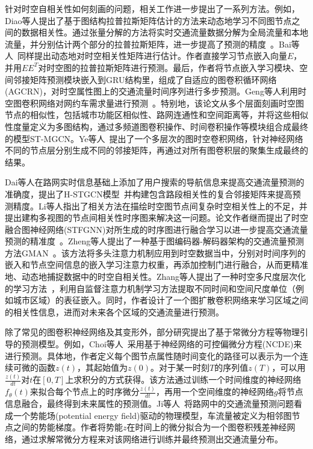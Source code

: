 针对时空自相关性如何刻画的问题，相关工作进一步提出了一系列方法。例如，Diao等人提出了基于图结构拉普拉斯矩阵估计的方法来动态地学习不同图节点之间的数据相关性。通过张量分解的方法将实时交通流量数据分解为全局流量和本地流量，并分别估计两个部分的拉普拉斯矩阵，进一步提高了预测的精度~\cite{diao2019dynamic}。Bai等人~\cite{bai2020adaptive}同样提出动态地对时空相关性矩阵进行估计。作者直接学习节点嵌入向量$E$，并用$EE^T$对时空图的拉普拉斯矩阵进行预测。最后，作者将节点嵌入学习模块、空间邻接矩阵预测模块嵌入到GRU结构里，组成了自适应的图卷积循环网络(AGCRN)，对时空属性图上的交通流量时间序列进行多步预测。Geng等人利用时空图卷积网络对网约车需求量进行预测~\cite{geng2019spatiotemporal}。特别地，该论文从多个层面刻画时空图节点的相似性，包括城市功能区相似性、路网连通性和空间距离等，并将这些相似性度量定义为多图结构，通过多频道图卷积操作、时间卷积操作等模块组合成最终的模型ST-MGCN。Ye等人~\cite{ye2021coupled}提出了一个多层次的图时空卷积网络，针对神经网络不同的节点层分别生成不同的邻接矩阵，再通过对所有图卷积层的聚集生成最终的结果。

Dai等人在路网实时信息基础上添加了用户搜索的导航信息来提高交通流量预测的准确度，提出了H-STGCN模型~\cite{dai2020hybrid}并构建包含路段相关性的复合邻接矩阵来提高预测精度。Li等人指出了相关方法在描绘时空图节点间复杂时空相关性上的不足，并提出建构多视图的节点间相关性时序图来解决这一问题。论文作者继而提出了时空融合图神经网络(STFGNN)对所生成的时序图进行融合学习以进一步提高交通流量预测的精准度~\cite{li2021spatial}。Zheng等人提出了一种基于图编码器-解码器架构的交通流量预测方法GMAN~\cite{zheng2020gman}。该方法将多头注意力机制应用到时空数据当中，分别对时间序列的嵌入和节点空间信息的嵌入学习注意力权重，再添加控制门进行融合，从而更精准地、动态地捕捉数据中的时空自相关性。Zhang等人提出了一种时空多尺度层次化的学习方法~\cite{zhang2021traffic}，利用自监督注意力机制学习方法提取不同时间和空间尺度单位（例如城市区域）的表征嵌入。同时，作者设计了一个图扩散卷积网络来学习区域之间的相关性信息，进而对未来各个区域的交通流量进行预测。

除了常见的图卷积神经网络及其变形外，部分研究提出了基于常微分方程等物理引导的预测模型。例如，Choi等人~\cite{choi2022graph}采用基于神经网络的可控偏微分方程(NCDE)来进行预测。具体地，作者定义每个图节点属性随时间变化的路径可以表示为一个连续可微的函数$z(t)$，其起始值为$z(0)$。对于某一时刻$T$的序列值$z(T)$，可以用$\frac{z(t)}{dt}$对$t$在$[0,T]$上求积分的方式获得。该方法通过训练一个时间维度的神经网络$f_\theta(t)$来拟合每个节点上的时序微分$\frac{z(t)}{dt}$，再用一个空间维度的神经网络$g$将节点信息融合，最终得到未来属性的预测值。Ji等人~\cite{ji2022stden}将路网中的交通流量预测问题看成一个势能场(potential energy field)驱动的物理模型，车流量被定义为相邻图节点之间的势能梯度。作者将势能$z$在时间上的微分拟合为一个图卷积残差神经网络，通过求解常微分方程来对该网络进行训练并最终预测出交通流量分布。

